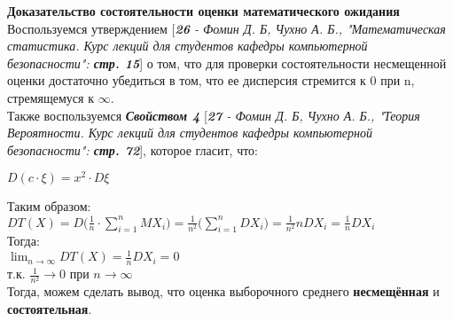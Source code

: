 \documentclass[14pt,a4paper,oneside]{extbook}
\begin{document}
    \textbf{Доказательство состоятельности оценки математического ожидания}\\
    Воспользуемся утверждением [\textit{\textbf{26} - Фомин Д. Б, Чухно А. Б., "Математическая статистика. Курс лекций для студентов кафедры компьютерной безопасности": \textbf{стр. 15}}] о том, что для проверки состоятельности несмещенной оценки достаточно убедиться в том, что ее дисперсия стремится к 0 при n, стремящемуся к $\infty$.\\
    Также воспользуемся \textit{\textbf{Свойством 4}} [\textit{\textbf{27} - Фомин Д. Б, Чухно А. Б., "Теория Вероятности. Курс лекций для студентов кафедры компьютерной безопасности": \textbf{стр. 72}}], которое гласит, что:
    \begin{center}
        $\displaystyle D(c \cdot \xi) = x^{2} \cdot D\xi$
    \end{center}
    Таким образом: \\
    $\displaystyle DT(X) = D\Big(\frac{1}{n} \cdot \sum_{i=1}^{n}M X_{i}\Big) = \frac{1}{n^2}\Big(\sum_{i=1}^{n}D X_{i}\Big) = \frac{1}{n^2}nDX_{i} = \frac{1}{n}DX_{i}$\\
    Тогда: \\
    $\displaystyle \lim_{n \longrightarrow \infty}DT(X) = \frac{1}{n}DX_{i} = 0$ \\
    т.к. $\displaystyle\frac{1}{n^2} \longrightarrow 0 \textrm{ при } n \longrightarrow \infty$\\
    Тогда, можем сделать вывод, что оценка выборочного среднего \textbf{несмещённая} и \textbf{состоятельная}.\\
    
\end{document}

